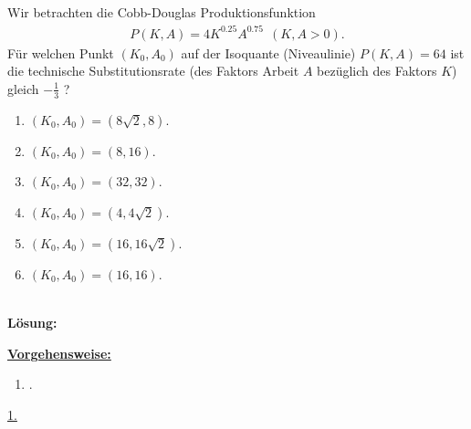 \newpage

\subsection*{}
Wir betrachten die Cobb-Douglas Produktionsfunktion
\begin{align*}
	P(K,A) 
	=
	4 K^{0.25} A^{0.75} \ \ (K,A > 0).
\end{align*}
Für welchen Punkt $ (K_0, A_0) $ auf der Isoquante (Niveaulinie) $ P(K,A) = 64 $ ist die technische Substitutionsrate (des Faktors Arbeit $ A $ bezüglich des Faktors $ K $) gleich $ - \frac{1}{3} $ ?
\renewcommand{\labelenumi}{(\alph{enumi})}
\begin{enumerate}
	\item 
	$ (K_0, A_0) = ( 8 \sqrt{2}, 8 ) $.
	\item
	$ (K_0, A_0) = ( 8 , 16 )$.
	\item
	$ (K_0, A_0) = ( 32 , 32)$.
	\item
	$ (K_0, A_0) = ( 4 , 4\sqrt{2})$.
	\item
	$ (K_0, A_0) = ( 16 , 16\sqrt{2})$.
	\item
	$ (K_0, A_0) = ( 16 , 16)$.
\end{enumerate}
\ \\
\textbf{Lösung:}
\begin{mdframed}
\underline{\textbf{Vorgehensweise:}}
\renewcommand{\labelenumi}{\theenumi.}
\begin{enumerate}
\item .
\end{enumerate}
\end{mdframed}

\underline{1.}\\




\newpage



